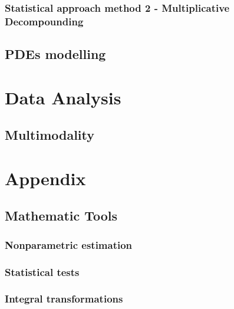 \documentclass[mainlanguage=french,fncychap=none, secnumdepth=paragraph]{yathesis}
\begin{document}
    \section{Statistical approach method 2 - Multiplicative Decompounding}

\chapter{PDEs modelling}

\part{Data Analysis}
\chapter{Multimodality}
    

\appendix
\part{Appendix}
\chapter{Mathematic Tools}
\section{Nonparametric estimation}
\section{Statistical tests}
\section{Integral transformations}

\backmatter

\printbibliography

\makebackcover
\end{document}
